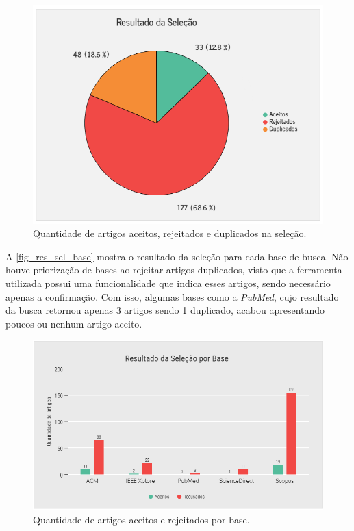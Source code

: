 \begin{figure}[htb]
  \caption{\label{fig_res_sel}Quantidade de artigos aceitos, rejeitados e duplicados na seleção.}
  \begin{center}
    \includegraphics[scale=0.7]{Imagens/msl/resultado_selecao.png}
  \end{center}
\end{figure}

A \autoref{fig_res_sel_base} mostra o resultado da seleção para cada base de busca.
Não houve priorização de bases ao rejeitar artigos duplicados, visto que a ferramenta utilizada possui uma funcionalidade que indica esses artigos, sendo necessário apenas a confirmação.
Com isso, algumas bases como a \emph{PubMed}, cujo resultado da busca retornou apenas 3 artigos sendo 1 duplicado, acabou apresentando poucos ou nenhum artigo aceito.

\begin{figure}[htb]
  \caption{\label{fig_res_sel_base}Quantidade de artigos aceitos e rejeitados por base.}
  \begin{center}
    \includegraphics[scale=0.6]{Imagens/msl/resultado_selecao_base.png}
  \end{center}
\end{figure}

